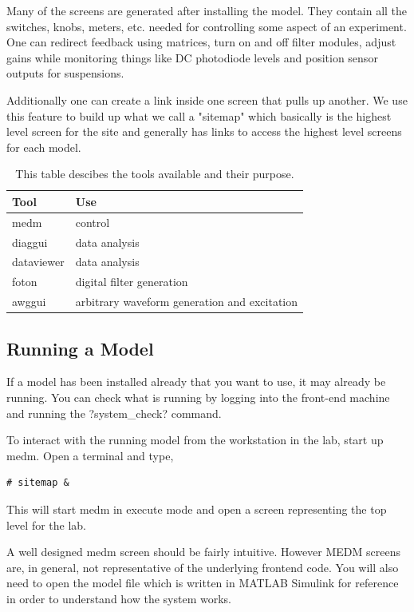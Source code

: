 Many of the screens are generated after installing the model. They contain all
the switches, knobs, meters, etc. needed for controlling some aspect of an
experiment. One can redirect feedback using matrices, turn on and off filter
modules, adjust gains while monitoring things like DC photodiode levels and
position sensor outputs for suspensions.

Additionally one can create a link inside one screen that pulls up another. We
use this feature to build up what we call a "sitemap" which basically is the
highest level screen for the site and generally has links to access the
highest level screens for each model.

\begin{table}
\begin{center}
\begin{tabular}{ | l | l | }
\hline
Tool & Use \\
\hline
medm & control \\
diaggui & data analysis \\
dataviewer & data analysis \\
foton & digital filter generation \\
awggui & arbitrary waveform generation and excitation \\
\hline
\end{tabular}
\end{center}
\caption[Front-End Tools]{This table descibes the tools available and their
purpose.
}
\label{table:fetools}
\end{table}

\subsection{Running a Model}

If a model has been installed already that you want to use, it may already be
running. You can check what is running by logging into the front-end machine
and running the \lstin?system_check? command.

To interact with the running model from the workstation in the lab, start up
medm. Open a terminal and type,
\begin{lstlisting}
# sitemap &
\end{lstlisting}
This will start medm in execute mode and open a screen representing the top
level for the lab.

A well designed medm screen should be fairly intuitive. However MEDM
screens are, in general, not representative of the underlying frontend
code. You will also need to open the model file which is written in MATLAB
Simulink for reference in order to understand how the system works.



